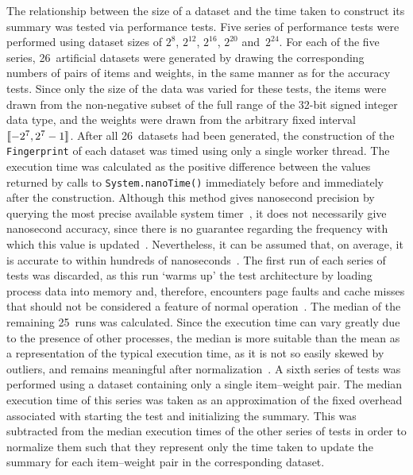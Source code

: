 The relationship between the size of a dataset and the time taken to construct its summary was tested via performance tests.
Five series of performance tests were performed using dataset sizes of \( 2^{8} \), \( 2^{12} \), \( 2^{16} \), \( 2^{20} \) and~\( 2^{24} \).
For each of the five series, \num{26}~artificial datasets were generated by drawing the corresponding numbers of pairs of items and weights, in the same manner as for the accuracy tests.
Since only the size of the data was varied for these tests, the items were drawn from the non-negative subset of the full range of the \num{32}-bit signed integer data type, and the weights were drawn from the arbitrary fixed interval \( \llbracket-2^{7}, 2^{7} - 1\rrbracket \).
After all \num{26}~datasets had been generated, the construction of the \lstinline{Fingerprint} of each dataset was timed using only a single worker thread.
The execution time was calculated as the positive difference between the values returned by calls to \lstinline{System.nanoTime()} immediately before and immediately after the construction.
Although this method gives nanosecond precision by querying the most precise available system timer~\citep{o14}, it does not necessarily give nanosecond accuracy, since there is no guarantee regarding the frequency with which this value is updated~\citep{lambert08}.
Nevertheless, it can be assumed that, on average, it is accurate to within hundreds of nanoseconds~\citep{kuperberg09}.
The first run of each series of tests was discarded, as this run `warms up' the test architecture by loading process data into memory and, therefore, encounters page faults and cache misses that should not be considered a feature of normal operation~\citep{luo04}.
The median of the remaining \num{25}~runs was calculated.
Since the execution time can vary greatly due to the presence of other processes, the median is more suitable than the mean as a representation of the typical execution time, as it is not so easily skewed by outliers, and remains meaningful after normalization~\citep{fleming86}.
A sixth series of tests was performed using a dataset containing only a single item--weight pair.
The median execution time of this series was taken as an approximation of the fixed overhead associated with starting the test and initializing the summary.
This was subtracted from the median execution times of the other series of tests in order to normalize them such that they represent only the time taken to update the summary for each item--weight pair in the corresponding dataset.

